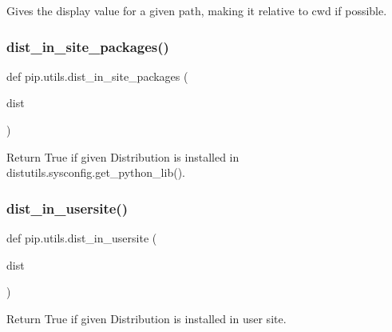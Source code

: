 \begin{DoxyVerb}Gives the display value for a given path, making it relative to cwd
if possible.\end{DoxyVerb}
 \mbox{\label{namespacepip_1_1utils_a911356b6335aff55445ce7d6a2bbb86b}} 
\subsubsection{\texorpdfstring{dist\+\_\+in\+\_\+site\+\_\+packages()}{dist\_in\_site\_packages()}}
{\footnotesize\ttfamily def pip.\+utils.\+dist\+\_\+in\+\_\+site\+\_\+packages (\begin{DoxyParamCaption}\item[{}]{dist }\end{DoxyParamCaption})}

\begin{DoxyVerb}Return True if given Distribution is installed in
distutils.sysconfig.get_python_lib().
\end{DoxyVerb}
 \mbox{\label{namespacepip_1_1utils_a97c22bdc73a3099c925fe895cdb65b95}} 
\subsubsection{\texorpdfstring{dist\+\_\+in\+\_\+usersite()}{dist\_in\_usersite()}}
{\footnotesize\ttfamily def pip.\+utils.\+dist\+\_\+in\+\_\+usersite (\begin{DoxyParamCaption}\item[{}]{dist }\end{DoxyParamCaption})}

\begin{DoxyVerb}Return True if given Distribution is installed in user site.
\end{DoxyVerb}
 \mbox{\label{namespacepip_1_1utils_ac0730c2dab662a0c11a4600cc6a240c3}} 

